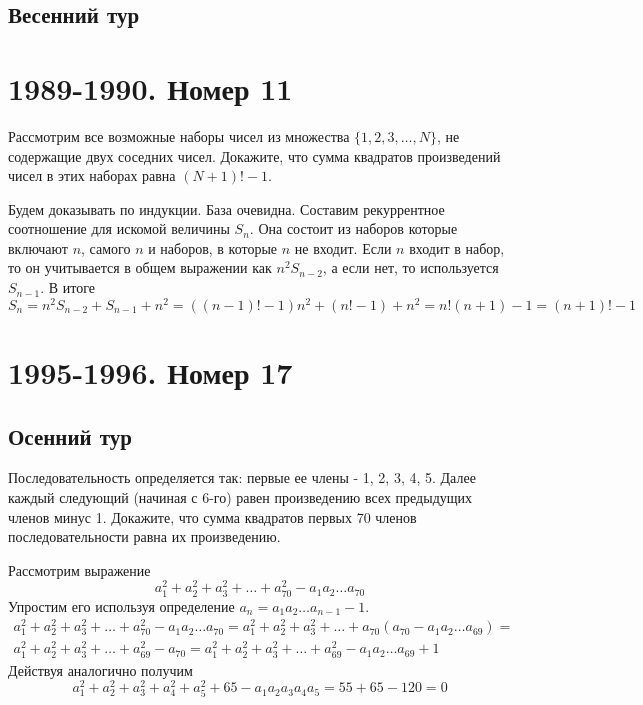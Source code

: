 \documentclass[11pt, a4paper]{common/document_template}
\begin{document}
\section{Весенний тур}

\chapter{1989-1990. Номер 11}

\begin{exercise}
Рассмотрим все возможные наборы чисел из множества $\{1, 2, 3, \dots, N\}$, не содержащие двух соседних чисел. Докажите, что сумма квадратов произведений чисел в этих наборах равна $(N+1)!-1$.
\end{exercise}

\begin{Solution}
Будем доказывать по индукции. База очевидна. Составим рекуррентное соотношение для искомой величины $S_{n}$. Она состоит из наборов которые включают $n$, самого $n$ и наборов, в которые $n$ не входит. Если $n$ входит в набор, то он учитывается в общем выражении как $n^{2}S_{n-2}$, а если нет, то используется $S_{n-1}$. В итоге
$$
S_{n} = n^{2}S_{n-2}+S_{n-1}+n^{2} = ((n-1)! - 1)n^{2} + (n! - 1) + n^{2} = n!(n + 1) - 1 = (n + 1)! - 1
$$  
\end{Solution}

\chapter{1995-1996. Номер 17}

\section{Осенний тур}

\begin{exercise}
Последовательность определяется так: первые ее члены - 1, 2, 3, 4, 5. Далее каждый следующий (начиная с 6-го) равен произведению всех предыдущих членов минус 1. Докажите, что сумма квадратов первых 70 членов последовательности равна их произведению.
\end{exercise}

\begin{Solution}
Рассмотрим выражение
$$
a_{1}^{2} + a_{2}^{2} + a_{3}^{2} + \dots + a_{70}^{2} - a_{1} a_{2} \dots a_{70}
$$
Упростим его используя определение $a_{n} = a_{1}a_{2}\dots a_{n-1} - 1$.
\begin{align*}
a_{1}^{2} + a_{2}^{2} + a_{3}^{2} + \dots + a_{70}^{2} - a_{1} a_{2} \dots a_{70} = a_{1}^{2} + a_{2}^{2} + a_{3}^{2} + \dots + a_{70} (a_{70} - a_{1} a_{2} \dots a_{69}) = \\ a_{1}^{2} + a_{2}^{2} + a_{3}^{2} + \dots + a_{69}^{2} - a_{70} =
a_{1}^{2} + a_{2}^{2} + a_{3}^{2} + \dots + a_{69}^{2} - a_{1}a_{2}\dots a_{69} + 1
\end{align*}
Действуя аналогично получим
$$
a_{1}^{2} + a_{2}^{2} + a_{3}^{2} + a_{4}^{2} + a_{5}^{2} + 65 - a_{1}a_{2}a_{3}a_{4}a_{5} = 55 + 65 - 120 = 0
$$
\end{Solution}
\end{document}
